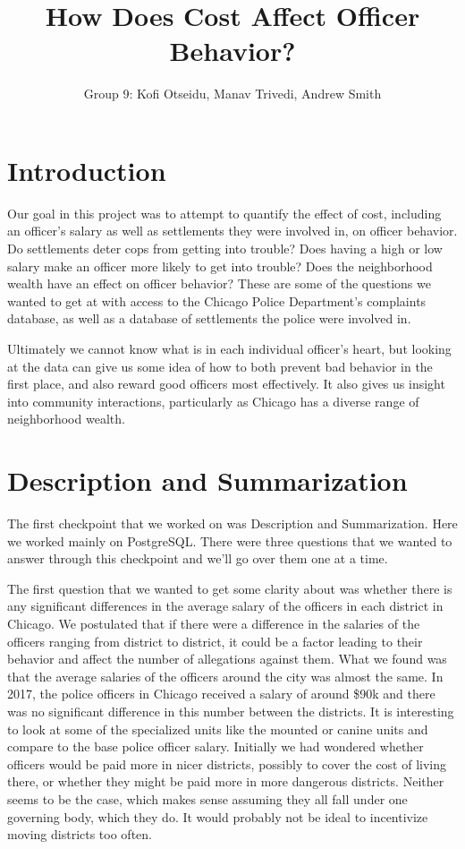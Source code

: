 \documentclass[11pt]{article}
\author{Group 9: Kofi Otseidu, Manav Trivedi, Andrew Smith}
\title{How Does Cost Affect Officer Behavior?}
\begin{document}
\maketitle


\section{Introduction}
Our goal in this project was to attempt to quantify the effect of cost, including an officer's salary as well as settlements they were involved in, on officer behavior. Do settlements deter cops from getting into trouble? Does having a high or low salary make an officer more likely to get into trouble? Does the neighborhood wealth have an effect on officer behavior? These are some of the questions we wanted to get at with access to the Chicago Police Department's complaints database, as well as a database of settlements the police were involved in.

Ultimately we cannot know what is in each individual officer's heart, but looking at the data can give us some idea of how to both prevent bad behavior in the first place, and also reward good officers most effectively. It also gives us insight into community interactions, particularly as Chicago has a diverse range of neighborhood wealth.


\section{Description and Summarization}
The first checkpoint that we worked on was Description and Summarization. Here we worked mainly on PostgreSQL. There were three questions that we wanted to answer through this checkpoint and we’ll go over them one at a time.

The first question that we wanted to get some clarity about was whether there is any significant differences in the average salary of the officers in each district in Chicago. We postulated that if there were a difference in the salaries of the officers ranging from district to district, it could be a factor leading to their behavior and affect the number of allegations against them. What we found was that the average salaries of the officers around the city was almost the same. In 2017, the police officers in Chicago received a salary of around \$90k and there was no significant difference in this number between the districts. It is interesting to look at some of the specialized units like the mounted or canine units and compare to the base police officer salary. Initially we had wondered whether officers would be paid more in nicer districts, possibly to cover the cost of living there, or whether they might be paid more in more dangerous districts. Neither seems to be the case, which makes sense assuming they all fall under one governing body, which they do. It would probably not be ideal to incentivize moving districts too often.
\end{document}
